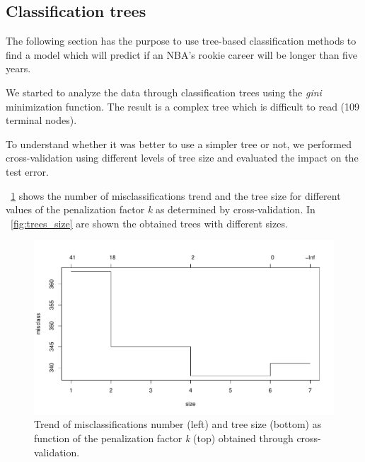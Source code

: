 \subsection{Classification trees}

The following section has the purpose to use tree-based classification methods to find a model which will predict if an NBA's rookie career will be longer than five years.

We started to analyze the data through classification trees using the \textit{gini} minimization function. The result is a complex tree which is difficult to read (109 terminal nodes).

To understand whether it was better to use a simpler tree or not, we performed cross-validation using different levels of tree size and evaluated the impact on the test error.

\Fig~\ref{fig:tree_cv_plot} shows the number of misclassifications trend and the tree size for different values of the penalization factor \textit{k} as determined by cross-validation. In \Fig~\ref{fig:trees_size} are shown the obtained trees with different sizes.

\begin{figure}[H]
	\centering
	\includegraphics[width=0.5\linewidth]{ImageFiles/Classification/Trees/tree_cv_plot.pdf}
	\caption{Trend of misclassifications number (left) and tree size (bottom) as function of the penalization factor \textit{k} (top) obtained through cross-validation.}
	\label{fig:tree_cv_plot}
\end{figure}

